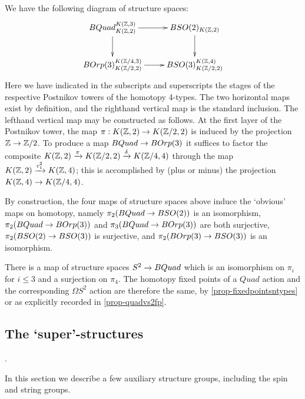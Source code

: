 \documentclass{amsart}
\begin{document}
We have the following diagram of structure spaces:
\[
\xymatrix{
BQuad_{K(\ZZ,2)}^{K(\ZZ,3)} \ar[r] \ar[d] & BSO(2)_{K(\ZZ,2)} \ar[d] \\
BOrp(3)_{K(\ZZ/2,2)}^{K(\ZZ/4,3)} \ar[r] & BSO(3)_{K(\ZZ/2,2)}^{K(\ZZ,4)}
}
\]
Here we have indicated in the subscripts and superscripts the stages of the respective Postnikov towers of the homotopy 4-types.  The two horizontal maps exist by definition, and the righthand vertical map is the standard inclusion.  The lefthand vertical map may be constructed as follows.  At the first layer of the Postnikov tower, the map $\pi: K(\mathbb Z,2) \rightarrow K(\mathbb Z/2,2)$ is induced by the projection $\mathbb Z \rightarrow \mathbb Z/2$.  To produce a map $BQuad \rightarrow BOrp(3)$ it suffices to factor the composite $K(\mathbb Z,2) \xrightarrow{\pi} K(\mathbb Z/2,2) \xrightarrow{\delta} K(\mathbb Z/4,4)$ through the map $K(\mathbb Z,2) \xrightarrow{c_1^2} K(\mathbb Z,4)$; this is accomplished by (plus or minus) the projection $K(\mathbb Z,4) \rightarrow K(\mathbb Z/4,4)$.  %

By construction, the four maps of structure spaces above induce the `obvious' maps on homotopy, namely $\pi_2(BQuad \rightarrow BSO(2))$ is an isomorphism, $\pi_2(BQuad \rightarrow BOrp(3))$ and $\pi_3(BQuad \rightarrow BOrp(3))$ are both surjective, $\pi_2(BSO(2) \rightarrow BSO(3))$ is surjective, and $\pi_2(BOrp(3) \rightarrow BSO(3))$ is an isomorphism.  

\begin{remark}
There is a map of structure spaces $S^2 \rightarrow BQuad$ which is an isomorphism on $\pi_i$ for $i \leq 3$ and a surjection on $\pi_4$.  The homotopy fixed points of a $Quad$ action and the corresponding $\Omega S^2$ action are therefore the same, by \cref{prop-fixedpointsntypes} or as explicitly recorded in \cref{prop-quadvs2fp}.
\end{remark}

\subsection{The `super'-structures}.


In this section we describe a few auxiliary structure groups, including the spin and string groups.
\end{document}
